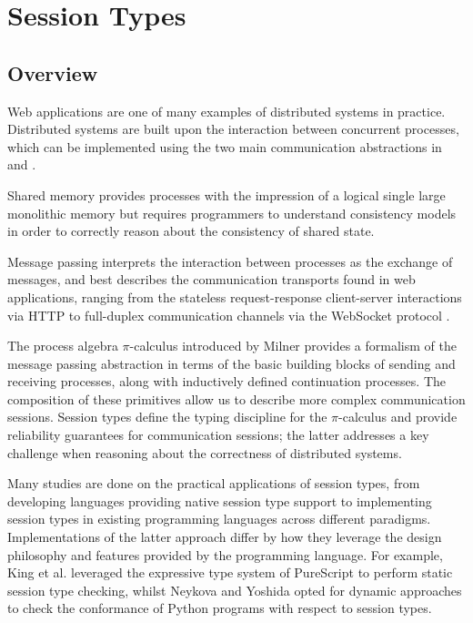 \section{Session Types}

\subsection{Overview}
Web applications are one of many examples of distributed systems in practice. Distributed systems are built upon the interaction between concurrent processes, which can be implemented using the two main communication abstractions in  and . 

Shared memory provides processes with the impression of a logical single large monolithic memory but requires programmers to understand consistency models in order to correctly reason about the consistency of shared state.

Message passing interprets the interaction between processes as the exchange of messages, and best describes the communication transports found in web applications, ranging from the stateless request-response client-server interactions via HTTP to full-duplex communication channels via the WebSocket protocol \cite{WebSocketRFC}.

The process algebra $\pi$-calculus introduced by Milner \cite{Milner1989} provides a formalism of the message passing abstraction in terms of the basic building blocks of sending and receiving processes, along with inductively defined continuation processes. The composition of these primitives allow us to describe more complex communication sessions.
Session types define the typing discipline for the $\pi$-calculus and provide reliability guarantees for communication sessions; the latter addresses a key challenge when reasoning about the correctness of distributed systems. 

Many studies are done on the practical applications of session types, from developing languages providing native session type support \cite{ATS2016} to implementing session types in existing programming languages across different paradigms.
Implementations of the latter approach differ by how they leverage the design philosophy and features provided by the programming language. For example, King et al. \cite{PureScript2019} leveraged the expressive type system of PureScript to perform static session type checking, whilst Neykova and Yoshida \cite{Python2017} opted for dynamic approaches to check the conformance of Python programs with respect to session types.

